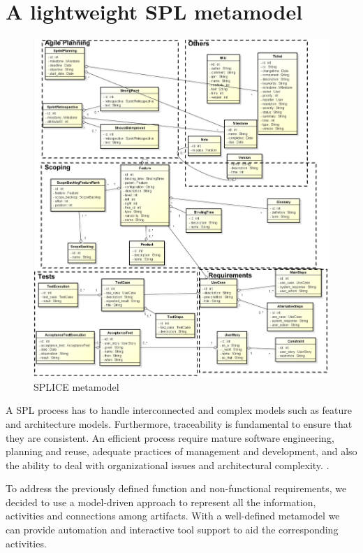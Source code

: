 \section{A lightweight SPL metamodel}
\label{sc:metamodel}
\begin{figure}[htp]
\begin{center}
  \includegraphics[width=16cm]{chapters/proposed_solution/img/diagram.png}
  \caption[\ac{SPLICE} Metamodel]{\ac{SPLICE} metamodel}
  \label{fg:metamodel}
\end{center}
\end{figure}



A \acf{SPL} process has to handle interconnected and complex models such as feature and architecture models. Furthermore, traceability is fundamental to ensure that they are consistent. An efficient process require mature software engineering, planning and reuse, adequate practices of management and development, and also the ability to deal with organizational issues and architectural complexity. \citep{Birk2007}.

To address the previously defined function and non-functional requirements, we decided to use a model-driven approach to represent all the information, activities and connections among artifacts. With a well-defined metamodel we can provide automation and interactive tool support to aid the corresponding activities.

